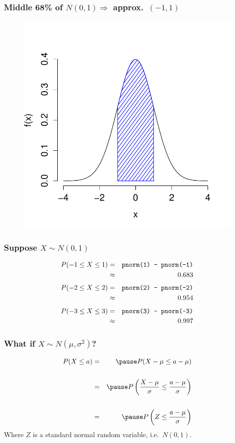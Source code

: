 \documentclass[handout]{beamer}
\begin{document}
\begin{frame}
\frametitle{Middle 68\% of $N(0,1) \Rightarrow$ approx.\ $(-1,1)$}
\begin{figure}
\includegraphics[scale = 0.65]{./images/normal_middle68}
\end{figure}
\end{frame}

\begin{frame}
\frametitle{Suppose $X \sim N(0,1)$}
\begin{eqnarray*}
	P(-1 \leq X \leq 1) &=& \mbox{\texttt{pnorm(1) - pnorm(-1)}}\\
		&\approx& 0.683
\end{eqnarray*}
\begin{eqnarray*}
	P(-2 \leq X \leq 2) &=& \mbox{\texttt{pnorm(2) - pnorm(-2)}}\\
		&\approx& 0.954
\end{eqnarray*}
\begin{eqnarray*}
	P(-3 \leq X \leq 3) &=& \mbox{\texttt{pnorm(3) - pnorm(-3)}}\\
		&\approx& 0.997
\end{eqnarray*}

\end{frame}
\begin{frame}
\frametitle{What if $X \sim N(\mu, \sigma^2)$?}
\begin{eqnarray*}
	P(X \leq a) &=& \pause P(X - \mu \leq a - \mu)\\\\
		&=& \pause P\left( \frac{X-\mu}{\sigma} \leq \frac{a - \mu}{\sigma} \right)\\\\
		&=&\pause  P\left(Z \leq  \frac{a - \mu}{\sigma}\right)
\end{eqnarray*}
Where $Z$ is a standard normal random variable, i.e.\ $N(0,1)$.
\end{frame}
\end{document}
